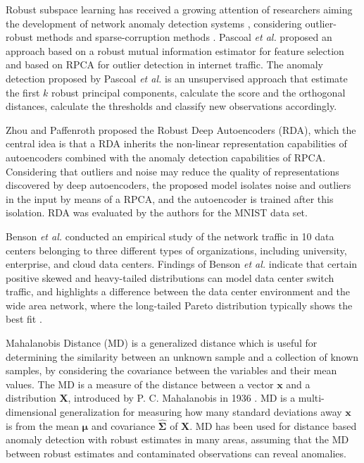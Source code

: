\documentclass[review]{elsarticle}
\begin{document}
Robust subspace learning has received a growing attention of researchers aiming the development of network anomaly detection systems \cite{ hubert2009robustskewed, pascoal2012robust, zhou2017anomaly}, considering outlier-robust methods and sparse-corruption methods \cite{lerman2018overview}. Pascoal \emph{et al.} \cite{pascoal2012robust} proposed an approach based on a robust mutual information estimator for feature selection and based on RPCA for outlier detection in internet traffic. The anomaly detection proposed by Pascoal \emph{et al.} \cite{pascoal2012robust} is an unsupervised approach that estimate the first $k$ robust principal components, calculate the score and the orthogonal distances, calculate the thresholds and classify new observations accordingly.

Zhou and Paffenroth \cite{zhou2017anomaly} proposed the Robust Deep Autoencoders (RDA), which the central idea is that a RDA inherits the non-linear representation capabilities of autoencoders combined with the anomaly detection capabilities of RPCA. Considering that outliers and noise may reduce the quality of representations discovered by deep autoencoders, the proposed model isolates noise and outliers in the input by means of a RPCA, and the autoencoder is trained after this isolation. RDA was evaluated by the authors for the MNIST data set.

Benson \emph{et al.} \cite{benson2010network} conducted an empirical study of the network traffic in 10 data centers belonging to three different types of organizations, including university, enterprise, and cloud data centers. Findings of Benson \emph{et al.} \cite{benson2010network} indicate that certain positive skewed and heavy-tailed distributions can model data center switch traffic, and highlights a difference between the data center environment and the wide area network, where the long-tailed Pareto distribution typically shows the best fit \cite{benson2010network}.

Mahalanobis Distance (MD) is a generalized distance which is useful for determining the similarity between an unknown sample and a collection of known samples, by considering the covariance between the variables and their mean values. The MD is a measure of the distance between a vector $\pmb{x}$ and a distribution $\pmb{X}$, introduced by P. C. Mahalanobis in 1936 \cite{mahalanobis1936md}. MD is a multi-dimensional generalization for measuring how many standard deviations away $\pmb{x}$ is from the mean $\pmb{\mu}$ and covariance $\hat{\pmb{\Sigma}}$ of $\pmb{X}$. MD has been used for distance based anomaly detection with robust estimates in many areas, assuming that the MD between robust estimates and contaminated observations can reveal anomalies.
\end{document}
